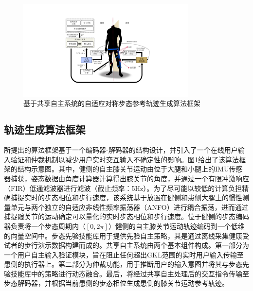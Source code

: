\begin{figure}[!t]
  \centering\includegraphics[width=0.8\textwidth]{figures/5-Fig-2.pdf}
  \caption{基于共享自主系统的自适应对称步态参考轨迹生成算法框架}
  \label{fig:5-2}
\end{figure}

\subsection{轨迹生成算法框架}
所提出的算法框架基于一个编码器-解码器的结构设计，并引入了一个在线用户输入验证和仲裁机制以减少用户实时交互输入不确定性的影响。图\ref{fig:5-2}给出了该算法框架的结构示意图。其中，健侧的自主膝关节运动由位于大腿和小腿上的IMU传感器捕获，姿态数据由角度计算器计算得出膝关节的角度，并通过一个有限冲激响应（FIR）低通滤波器进行滤波（截止频率：5Hz）。为了尽可能以较低的计算负担精确捕捉实时的步态相位和步行速度，该系统基于放置在健侧和患侧大腿上的惯性测量单元与两个独立的自适应非线性频率振荡器（ANFO）进行耦合振荡，进而通过捕捉髋关节的运动确定可以量化的实时步态相位和步行速度。位于健侧的步态编码器负责将一个步态周期内（$[0,2\pi ]$）健侧的自主膝关节运动轨迹编码到一个低维的向量空间中。步态先验技能库用于提供先验自主策略，其是通过离线采集健康受试者的步行演示数据构建而成的。共享自主系统由两个基本组件构成。第一部分为一个用户自主输入验证模块，旨在阻止任何超出GKL范围的实时用户输入传输至患侧的执行器上。第二部分为仲裁功能，用于推断用户的输入意图并将其与步态先验技能库中的策略进行动态融合。最后，将经过共享自主处理后的交互指令传输至步态解码器，并根据当前患侧的步态相位生成患侧的膝关节运动参考轨迹。


